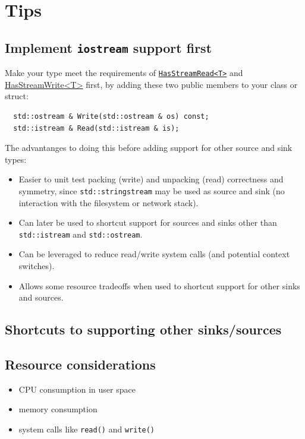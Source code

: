 \chapter{Tips}

\section{Implement \texttt{iostream} support first}
Make your type meet the requirements of
\hyperlink{concept:HasStreamRead}{\texttt{HasStreamRead<T>}} and
\hyperlink{concept:HasStreamWrite}{\ttfamily HasStreamWrite<T>}
first, by adding these two public members to your class or struct:

\begin{verbatim}
  std::ostream & Write(std::ostream & os) const;
  std::istream & Read(std::istream & is);
\end{verbatim}

The advantanges to doing this before adding support for other source
and sink types:

\begin{itemize}
\item Easier to unit test packing (write) and unpacking (read)
  correctness and symmetry, since \texttt{std::stringstream} may be
  used as source and sink (no interaction with the filesystem or
  network stack).
\item Can later be used to shortcut support for sources and sinks
  other than \texttt{std::istream} and \texttt{std::ostream}.
\item Can be leveraged to reduce read/write system calls (and
  potential context switches).
\item Allows some resource tradeoffs when used to shortcut support
  for other sinks and sources.
\end{itemize}

\section{Shortcuts to supporting other sinks/sources}

\section{Resource considerations}
\begin{itemize}
\item[] CPU consumption in user space
\item[] memory consumption
\item[] system calls like \texttt{read()} and \texttt{write()}
\end{itemize}
